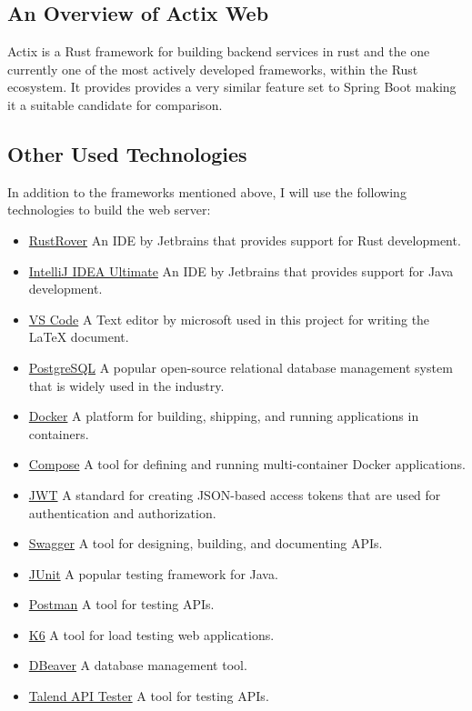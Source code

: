 \documentclass[a4paper,12pt]{article}
\begin{document}
	\subsection{An Overview of Actix Web}
	\label{subsec:actix_web}
	Actix is a Rust framework for building backend services in rust and the one currently one of the most actively developed frameworks,
	within the Rust ecosystem. It provides provides a very similar feature set to Spring Boot making it a suitable candidate for comparison.

	\newpage
	\subsection{Other Used Technologies}
	\label{subsec:used_technologies}
	In addition to the frameworks mentioned above, I will use the following technologies to build the web server:
	\begin{itemize}
		\item \href{https://www.jetbrains.com/de-de/rust/}{RustRover} An IDE by Jetbrains that provides support for Rust development.
		\item \href{https://www.jetbrains.com/de-de/idea/}{IntelliJ IDEA Ultimate} An IDE by Jetbrains that provides support for Java development.
		\item \href{https://code.visualstudio.com/}{VS Code} A Text editor by microsoft used in this project for writing the LaTeX document.
		\item \href{https://www.postgresql.org/}{PostgreSQL} A popular open-source relational database management system that is widely used in the industry.
		\item \href{https://www.docker.com/}{Docker} A platform for building, shipping, and running applications in containers.
		\item \href{https://docs.docker.com/compose/}{Compose} A tool for defining and running multi-container Docker applications.
		\item \href{https://jwt.io/}{JWT} A standard for creating JSON-based access tokens that are used for authentication and authorization.
		\item \href{https://swagger.io/}{Swagger}  A tool for designing, building, and documenting APIs.
		\item \href{https://junit.org/junit5/}{JUnit} A popular testing framework for Java.
		\item \href{https://www.postman.com/}{Postman} A tool for testing APIs.
		\item \href{https://k6.io/}{K6} A tool for load testing web applications.
		\item \href{https://dbeaver.io/}{DBeaver} A database management tool.
		\item \href{https://chromewebstore.google.com/detail/talend-api-tester-free-ed/aejoelaoggembcahagimdiliamlcdmfm}{Talend API Tester} A tool for testing APIs.
	\end{itemize}
\end{document}
